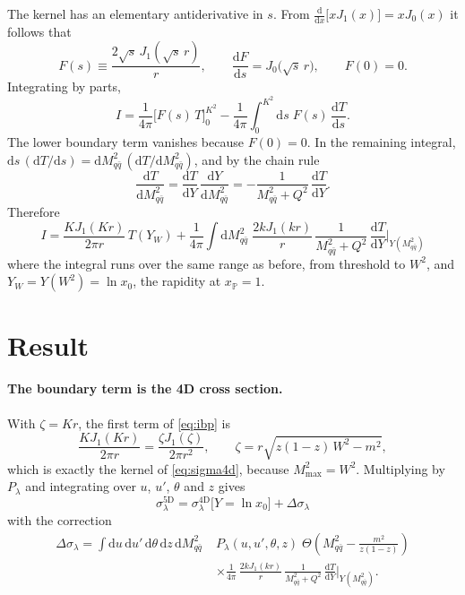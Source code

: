 \documentclass[11pt,a4paper]{article}
\newcommand{\Mqq}{M_{q\bar q}^2}
\newcommand{\dd}{\mathrm{d}}
\newcommand{\xP}{x_{\mathbb{P}}}
\begin{document}
The kernel has an elementary antiderivative in $s$. From
$\frac{\dd}{\dd x} \big[ x J_1(x) \big] = x J_0(x)$ it follows that
\begin{equation}
  F(s) \equiv \frac{2\sqrt{s}\, J_1(\sqrt{s}\, r)}{r} ,
  \qquad
  \frac{\dd F}{\dd s} = J_0\big(\sqrt{s}\, r\big) ,
  \qquad
  F(0) = 0 .
\end{equation}
Integrating by parts,
\begin{equation}
  I = \frac{1}{4\pi} \Big[ F(s) \, T \Big]_{0}^{K^2}
    - \frac{1}{4\pi} \int_0^{K^2} \dd s \; F(s) \, \frac{\dd T}{\dd s} .
\end{equation}
The lower boundary term vanishes because $F(0) = 0$. In the remaining integral,
$\dd s \, (\dd T / \dd s) = \dd\Mqq \, (\dd T / \dd \Mqq)$, and by the chain rule
\begin{equation}
  \frac{\dd T}{\dd \Mqq}
  = \frac{\dd T}{\dd Y} \, \frac{\dd Y}{\dd \Mqq}
  = - \frac{1}{\Mqq + Q^2} \, \frac{\dd T}{\dd Y} .
\end{equation}
Therefore
\begin{equation}
  \boxed{
  I = \frac{K J_1(K r)}{2\pi r} \, T(Y_W)
    + \frac{1}{4\pi} \int \dd\Mqq \;
      \frac{2 k J_1(k r)}{r} \,
      \frac{1}{\Mqq + Q^2} \,
      \frac{\dd T}{\dd Y}\bigg|_{Y(\Mqq)}
  }
  \label{eq:ibp}
\end{equation}
where the integral runs over the same range as before, from threshold to $W^2$,
and $Y_W = Y(W^2) = \ln x_0$, the rapidity at $\xP = 1$.

\section{Result}

\paragraph{The boundary term is the 4D cross section.}
With $\zeta = K r$, the first term of \eqref{eq:ibp} is
\begin{equation}
  \frac{K J_1(K r)}{2\pi r} = \frac{\zeta J_1(\zeta)}{2\pi r^2} ,
  \qquad
  \zeta = r \sqrt{z(1-z) \, W^2 - m^2} ,
\end{equation}
which is exactly the kernel of \eqref{eq:sigma4d}, because $M_{\max}^2 = W^2$.
Multiplying by $P_\lambda$ and integrating over $u$, $u'$, $\theta$ and $z$
gives
\begin{equation}
  \boxed{
  \sigma_\lambda^{\text{5D}}
  = \sigma_\lambda^{\text{4D}}\big[Y = \ln x_0\big]
  + \Delta\sigma_\lambda
  }
\end{equation}
with the correction
\begin{equation}
  \begin{split}
  \Delta\sigma_\lambda
  = \int \dd u \, \dd u' \, \dd\theta \, \dd z \, \dd\Mqq \;
    &P_\lambda(u, u', \theta, z) \;
    \Theta\!\left(\Mqq - \frac{m^2}{z(1-z)}\right) \\
    &\times \frac{1}{4\pi} \, \frac{2 k J_1(k r)}{r} \,
    \frac{1}{\Mqq + Q^2} \,
    \frac{\dd T}{\dd Y}\bigg|_{Y(\Mqq)} .
  \end{split}
  \label{eq:correction}
\end{equation}
\end{document}
